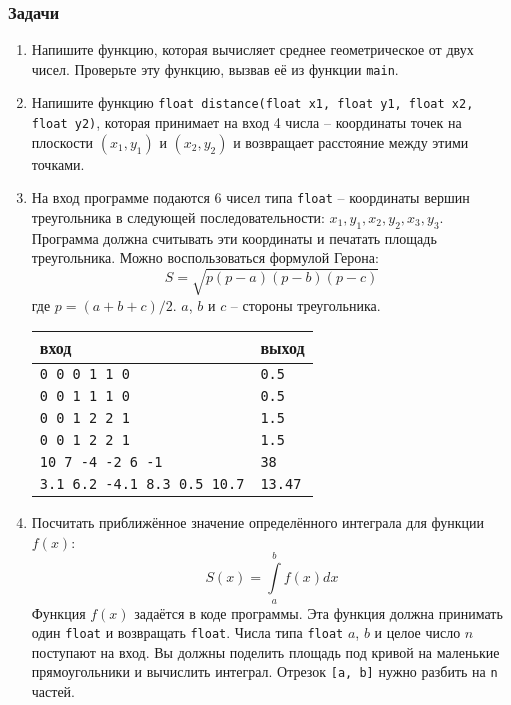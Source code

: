 \documentclass{article}
\begin{document}
\subsubsection*{Задачи}
\begin{enumerate}
\item Напишите функцию, которая вычисляет среднее геометрическое от двух чисел. Проверьте эту функцию, вызвав её из функции \texttt{main}.
\item Напишите функцию \texttt{float distance(float x1, float y1, float x2, float y2)}, которая принимает на вход 4 числа -- координаты точек на плоскости $(x_1, y_1)$ и $(x_2, y_2)$ и возвращает расстояние между этими точками.
\item На вход программе подаются 6 чисел типа \texttt{float} -- координаты вершин треугольника в следующей последовательности: 
$x_1, y_1, x_2, y_2, x_3, y_3$. Программа должна считывать эти координаты и печатать площадь треугольника. Можно воспользоваться формулой Герона:
$$
S = \sqrt{p(p - a)(p - b)(p - c)}
$$
где $p = (a + b + c) / 2$. $a$, $b$ и $c$ -- стороны треугольника.

\begin{center}
\begin{tabular}{ l l }
 вход & выход \\ \hline
 \texttt{0 0 0 1 1 0} & \texttt{0.5}  \\ 
 \texttt{0 0 1 1 1 0} & \texttt{0.5}  \\ 
 \texttt{0 0 1 2 2 1} & \texttt{1.5}  \\  
 \texttt{0 0 1 2 2 1} & \texttt{1.5}  \\ 
 \texttt{10 7 -4 -2 6 -1} & \texttt{38}  \\
 \texttt{3.1 6.2 -4.1 8.3 0.5 10.7} & \texttt{13.47}  \\
 \end{tabular}
\end{center}


\item Посчитать приближённое значение определённого интеграла для функции $f(x)$:
$$
S \left( x \right) = \int\limits_a^b {f(x)} dx
$$
Функция $f(x)$ задаётся в коде программы. Эта функция должна принимать один \texttt{float} и возвращать \texttt{float}. Числа типа \texttt{float} $a$, $b$ и целое число $n$ поступают на вход. Вы должны поделить площадь под кривой на маленькие прямоугольники и вычислить интеграл. Отрезок \texttt{[a, b]} нужно разбить на \texttt{n} частей.

\end{enumerate}
\newpage
\end{document}
